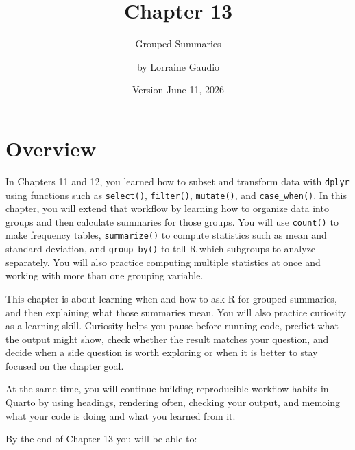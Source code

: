 \documentclass[
]{article}
\title{Chapter 13}
\subtitle{ Grouped Summaries}
\author{by Lorraine Gaudio}
\date{Version June 11, 2026}
\begin{document}
\maketitle

{
\setcounter{tocdepth}{2}
\tableofcontents
}
\section{Overview}\label{overview}

In Chapters 11 and 12, you learned how to subset and transform data with
\texttt{dplyr} using functions such as \texttt{select()},
\texttt{filter()}, \texttt{mutate()}, and \texttt{case\_when()}. In this
chapter, you will extend that workflow by learning how to organize data
into groups and then calculate summaries for those groups. You will use
\texttt{count()} to make frequency tables, \texttt{summarize()} to
compute statistics such as mean and standard deviation, and
\texttt{group\_by()} to tell R which subgroups to analyze separately.
You will also practice computing multiple statistics at once and working
with more than one grouping variable.

This chapter is about learning when and how to ask R for grouped
summaries, and then explaining what those summaries mean. You will also
practice curiosity as a learning skill. Curiosity helps you pause before
running code, predict what the output might show, check whether the
result matches your question, and decide when a side question is worth
exploring or when it is better to stay focused on the chapter goal.

At the same time, you will continue building reproducible workflow
habits in Quarto by using headings, rendering often, checking your
output, and memoing what your code is doing and what you learned from
it.

By the end of Chapter 13 you will be able to:
\end{document}

